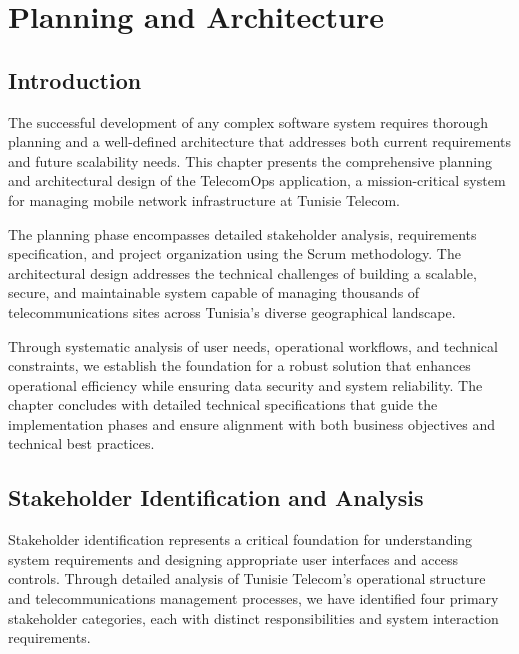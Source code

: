 \newpage

\chapter{Planning and Architecture}

\cfoot{\thepage}

\parindent=0.5in
\onehalfspacing

\section{Introduction}

The successful development of any complex software system requires thorough planning and a well-defined architecture that addresses both current requirements and future scalability needs. This chapter presents the comprehensive planning and architectural design of the TelecomOps application, a mission-critical system for managing mobile network infrastructure at Tunisie Telecom.

The planning phase encompasses detailed stakeholder analysis, requirements specification, and project organization using the Scrum methodology. The architectural design addresses the technical challenges of building a scalable, secure, and maintainable system capable of managing thousands of telecommunications sites across Tunisia's diverse geographical landscape.

Through systematic analysis of user needs, operational workflows, and technical constraints, we establish the foundation for a robust solution that enhances operational efficiency while ensuring data security and system reliability. The chapter concludes with detailed technical specifications that guide the implementation phases and ensure alignment with both business objectives and technical best practices.

\section{Stakeholder Identification and Analysis}

Stakeholder identification represents a critical foundation for understanding system requirements and designing appropriate user interfaces and access controls. Through detailed analysis of Tunisie Telecom's operational structure and telecommunications management processes, we have identified four primary stakeholder categories, each with distinct responsibilities and system interaction requirements.

